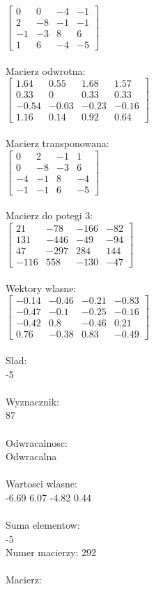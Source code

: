 \documentclass[a4paper,12pt]{article}
\begin{document}
$\begin{bmatrix} 0&0&-4&-1\\2&-8&-1&-1\\-1&-3&8&6\\1&6&-4&-5 \end{bmatrix}$
\\
\\
Macierz odwrotna:\\

$\begin{bmatrix} 1.64&0.55&1.68&1.57\\0.33&0&0.33&0.33\\-0.54&-0.03&-0.23&-0.16\\1.16&0.14&0.92&0.64 \end{bmatrix}$
\\
\\
Macierz transponowana:\\

$\begin{bmatrix} 0&2&-1&1\\0&-8&-3&6\\-4&-1&8&-4\\-1&-1&6&-5 \end{bmatrix}$
\\
\\
Macierz do potegi 3:\\

$\begin{bmatrix} 21&-78&-166&-82\\131&-446&-49&-94\\47&-297&284&144\\-116&558&-130&-47 \end{bmatrix}$
\\
\\
Wektory wlasne:\\

$\begin{bmatrix} -0.14&-0.46&-0.21&-0.83\\-0.47&-0.1&-0.25&-0.16\\-0.42&0.8&-0.46&0.21\\0.76&-0.38&0.83&-0.49 \end{bmatrix}$
\\
\\
Slad:\\
-5
\\
\\
Wyznacznik:\\
87
\\
\\
Odwracalnosc:\\
Odwracalna
\\
\\
Wartosci wlasne:\\
-6.69 6.07 -4.82 0.44
\\
\\
Suma elementow:\\
-5
\\
\newpage
Numer macierzy:
292
\\
\\
Macierz:\\
\end{document}
